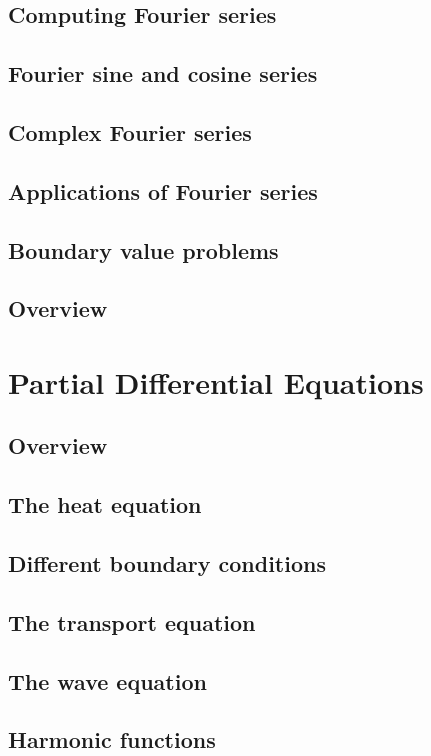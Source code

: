 \documentclass{article}
\begin{document}
\subsection{Computing Fourier series}
\subsection{Fourier sine and cosine series}
\subsection{Complex Fourier series}
\subsection{Applications of Fourier series}
\subsection{Boundary value problems}

\subsection*{Overview}

\pagebreak
\section{Partial Differential Equations}
\subsection*{Overview}

\subsection{The heat equation}
\subsection{Different boundary conditions}
\subsection{The transport equation}
\subsection{The wave equation}
\subsection{Harmonic functions}
\end{document}
